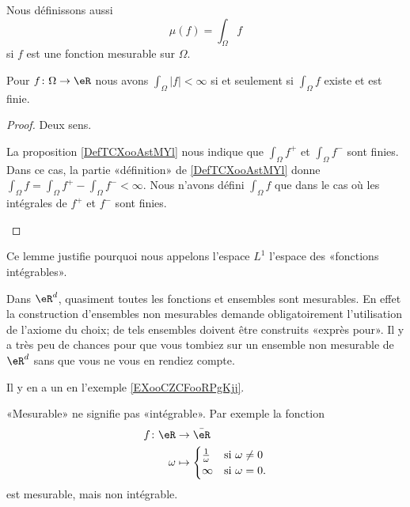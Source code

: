 Nous définissons aussi
\begin{equation}
	\mu(f)=\int_{\Omega}f
\end{equation}
si \( f\) est une fonction mesurable sur \( \Omega\).

\begin{lemma}       \label{LEMooMWKTooIKomSw}
	Pour \( f\colon \Omega\to \eR\) nous avons \( \int_{\Omega}| f |<\infty\) si et seulement si \( \int_{\Omega}f\) existe et est finie.
\end{lemma}

\begin{proof}
	Deux sens.
	\begin{subproof}
		\spitem[\( \Rightarrow\)]
		La proposition \ref{DefTCXooAstMYl} nous indique que \( \int_{\Omega}f^+\) et \( \int_{\Omega}f^-\) sont finies. Dans ce cas, la partie «définition» de \ref{DefTCXooAstMYl} donne \( \int_{\Omega}f=\int_{\Omega}f^+-\int_{\Omega}f^-<\infty\).
		\spitem[\( \Leftarrow\)]
		Nous n'avons défini \( \int_{\Omega}f\) que dans le cas où les intégrales de \( f^+\) et \( f^-\) sont finies.
	\end{subproof}
\end{proof}
Ce lemme justifie pourquoi nous appelons l'espace \( L^1\) l'espace des «fonctions intégrables».

\begin{remark}
	Dans \( \eR^d\), quasiment toutes les fonctions et ensembles sont mesurables. En effet la construction d'ensembles non mesurables demande obligatoirement l'utilisation de l'axiome du choix; de tels ensembles doivent être construits «exprès pour». Il y a très peu de chances pour que vous tombiez sur un ensemble non mesurable de \( \eR^d\) sans que vous ne vous en rendiez compte.

	Il y en a un en l'exemple \ref{EXooCZCFooRPgKjj}.
\end{remark}

\begin{remark}
	«Mesurable» ne signifie pas «intégrable». Par exemple la fonction
	\begin{equation}
		\begin{aligned}
			f\colon \eR & \to \bar\eR                        \\
			\omega      & \mapsto\begin{cases}
				\frac{1}{ \omega } & \text{si } \omega\neq 0 \\
				\infty             & \text{si }\omega=0.
			\end{cases}
		\end{aligned}
	\end{equation}
	est mesurable, mais non intégrable.
\end{remark}

